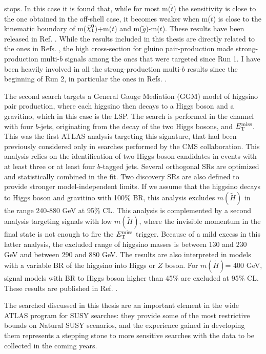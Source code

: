 \documentclass[11pt,a4paper]{article}
\newcommand{\met}{\ensuremath{E_{\rm T}^{\mathrm{miss}}}\xspace}
\newcommand*{\gluino}{\ensuremath{\tilde{g}}\xspace}
\def\mhino{\ensuremath{m(\tilde{H})}\xspace}
\newcommand*{\ninoone}{\ensuremath{\mathchoice%
      {\displaystyle\raise.4ex\hbox{$\displaystyle\tilde\chi^0_1$}}%
         {\textstyle\raise.4ex\hbox{$\textstyle\tilde\chi^0_1$}}%
       {\scriptstyle\raise.3ex\hbox{$\scriptstyle\tilde\chi^0_1$}}%
 {\scriptscriptstyle\raise.3ex\hbox{$\scriptscriptstyle\tilde\chi^0_1$}}}\xspace}
\begin{document}
stops. In this case it is found that, while for most m($\tilde{t}$) the sensitivity 
is close to the one obtained in the off-shell case, it becomes weaker 
when m($\tilde{t}$) is close to the kinematic boundary of 
m(\ninoone)+m($t$) and m(\gluino)-m($t$).  
These results have been released in Ref. \cite{ATLAS-CONF-2018-041}. 
While the results included in this thesis are directly related to the ones in Refs. \cite{Aaboud:2017hrg,ATLAS-CONF-2018-041}, 
the high cross-section for gluino pair-production made strong-production multi-$b$ signals among the ones that were targeted since Run 1. 
I have been heavily involved in all the strong-production multi-$b$ results since the beginning of Run 2, in particular the ones in Refs. \cite{Aad:2016eki,ATLAS-CONF-2016-052}. 


The second search targets a General Gauge Mediation (GGM) model of higgsino pair production, where each higgsino then decays to a Higgs boson and 
a gravitino, which in this case is the LSP. 
The search is performed in the channel with four $b$-jets, originating from 
the decay of the two Higgs bosons, and \met. 
This was the first ATLAS analysis targeting this signature, that had been 
previously considered only in searches performed by the CMS collaboration.
This analysis relies on the identification of two Higgs boson candidates in events with at least three or 
at least four $b$-tagged jets. Several orthogonal SRs are optimized and statistically combined in the fit. 
Two discovery SRs are also defined to provide stronger model-independent limits. 
If we assume that the higgsino decays to Higgs boson and gravitino with 100\% BR, 
this analysis excludes \mhino in the range 240-880 GeV at 95\% CL. 
This analysis is complemented by a second analysis targeting signals with low \mhino, where the 
invisible momentum in the final state is not enough to fire the \met trigger. 
Because of a mild excess in this latter analysis, the excluded range of higgsino masses is 
between 130 and 230 GeV and between 290 and 880 GeV.
The results are also interpreted in models with a variable BR of the higgsino into Higgs or $Z$ boson. 
For \mhino = 400 GeV, signal models with BR to Higgs boson higher than 45\% are 
excluded at 95\% CL.
These results are published in Ref. \cite{Aaboud:2018htj}. 


The searched discussed in this thesis are an important element in the wide ATLAS program 
for SUSY searches: they  
provide some of the most restrictive bounds on Natural SUSY scenarios, 
and the experience gained in developing them represents a stepping stone to more sensitive searches 
with the data to be collected in the coming years.
\end{document}
